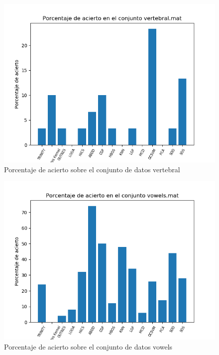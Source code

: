 \begin{figure}[H]
	\centering
	\label{vertebral_accuracy}
	\includegraphics[scale=0.7]{imagenes/imgs-exp1/accuracy/vertebral}
	\caption{Porcentaje de acierto sobre el conjunto de datos vertebral}
\end{figure}

\begin{figure}[H]
	\centering
	\label{vowels_accuracy}
	\includegraphics[scale=0.7]{imagenes/imgs-exp1/accuracy/vowels}
	\caption{Porcentaje de acierto sobre el conjunto de datos vowels}
\end{figure}

